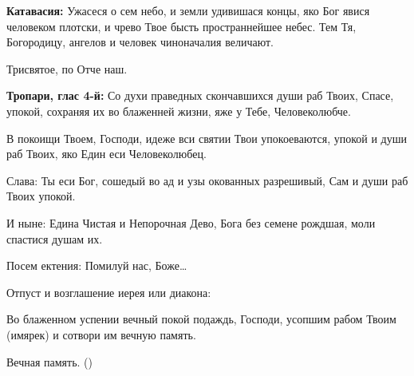 \begin{mymulticols}
{\bfseries Катавасия:} Ужасеся о сем небо, и земли удивишася концы, яко Бог явися человеком плотски, и чрево Твое бысть пространнейшее небес. Тем Тя, Богородицу, ангелов и человек чиноначалия величают. 

Трисвятое, по Отче наш. 

{\bfseries Тропари, глас 4-й:} Со духи праведных скончавшихся души раб Твоих, Спасе, упокой, сохраняя их во блаженней жизни, яже у Тебе, Человеколюбче. 

В покоищи Твоем, Господи, идеже вси святии Твои упокоеваются, упокой и души раб Твоих, яко Един еси Человеколюбец. 

Слава: Ты еси Бог, сошедый во ад и узы окованных разрешивый, Сам и души раб Твоих упокой. 

И ныне: Едина Чистая и Непорочная Дево, Бога без семене рождшая, моли спастися душам их. 

Посем ектения: Помилуй нас, Боже… 

Отпуст и возглашение иерея или диакона: 

Во блаженном успении вечный покой подаждь, Господи, усопшим рабом Твоим (имярек) и сотвори им вечную память. 

 Вечная память. ()

\end{mymulticols}

\mychapterending


